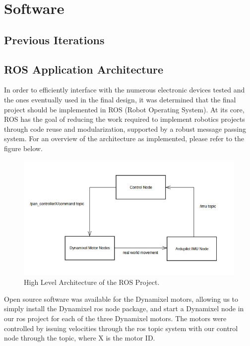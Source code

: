 \documentclass[12pt,conference,onecolumn,titlepage]{IEEEtran} %
\begin{document}
\section{Software}
\label{sec:software}
% 

\subsection{Previous Iterations}
\label{sec:previous-iterations}

\subsection{ROS Application Architecture} %
\label{sec:ros-appl-arch}
In order to efficiently interface with the numerous electronic devices tested and the ones eventually used in the final design, it was determined that the final project should be implemented in ROS (Robot Operating System). At its core, ROS has the goal of reducing the work required to implement robotics projects through code reuse and modularization, supported by a robust message passing system. For an overview of the architecture as implemented, please refer to the figure below.

\begin{figure}[h!]
  \centering
  \includegraphics[width=\textwidth]{rosarcitecture.jpg}
  \caption{High Level Architecture of the ROS Project.}
  \label{fig:ROSArchitecture}
\end{figure}

Open source software was available for the Dynamixel motors, allowing us to simply install the Dynamixel ros node package, and start a Dynamixel node in our ros project for each of the three Dynamixel motors. The motors were controlled by issuing velocities through the ros topic system with our control node through the  topic, where X is the motor ID.
\end{document}
